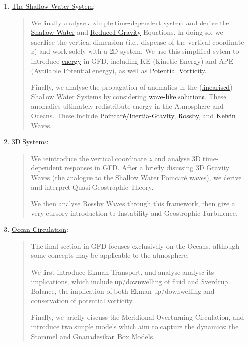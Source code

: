 \begin{enumerate}
    \item \hyperref[Shallow Water System]{The Shallow Water System}:
        
        \begin{quote}
            We finally analyse a simple time-dependent system and derive the \hyperref[shallow box]{Shallow Water} and \hyperref[s Reduced Gravity]{Reduced Gravity} Equations. In doing so, we sacrifice the vertical dimension (i.e., dispense of the vertical coordinate \(z\)) and work solely with a 2D system. We use this simplified sytem to introduce \hyperref[s SW energy]{energy} in GFD, including KE (Kinetic Energy) and APE (Available Potential energy), as well as \hyperref[PV]{Potential Vorticity}. 
            
            Finally, we analyse the propagation of anomalies in the (\hyperref[L SW Eqn]{linearised}) Shallow Water Systems by considering \hyperref[s Primer Waves]{wave-like solutions}. These anomalies ultimately redistribute energy in the Atmosphere and Oceans. These include \hyperref[2D Poincare]{Poincaré/Inertia-Gravity}, \hyperref[s Rossby SW]{Rossby}, and \hyperref[s Kelvin]{Kelvin} Waves.
        \end{quote}
    
    \item \hyperref[3D Systems]{3D Systems}:
        
        \begin{quote}
            We reintroduce the vertical coordinate \(z\) and analyse 3D time-dependent responses in GFD. After a briefly disussing 3D Gravity Waves (the analogue to the Shallow Water Poincaré waves), we derive and interpret Quasi-Geostrophic Theory.
            
            We then analyse Rossby Waves through this framework, then give a very cursory introduction to Instability and Geostrophic Turbulence.
        \end{quote}

    \item \hyperref[Oceans]{Ocean Circulation}:
        
        \begin{quote}
            The final section in GFD focuses exclusively on the Oceans, although some concepts may be applicable to the atmosphere. 
            
            We first introduce Ekman Transport, and analyse analyse its implications, which include up/downwelling of fluid and Sverdrup Balance, the implication of both Ekman up/downwelling and conservation of potential vorticity.
            
            Finally, we briefly discuss the Meridional Overturning Circulation, and introduce two simple models which aim to capture the dynamics: the Stommel and Gnanadesikan Box Models.
        \end{quote}
\end{enumerate}

